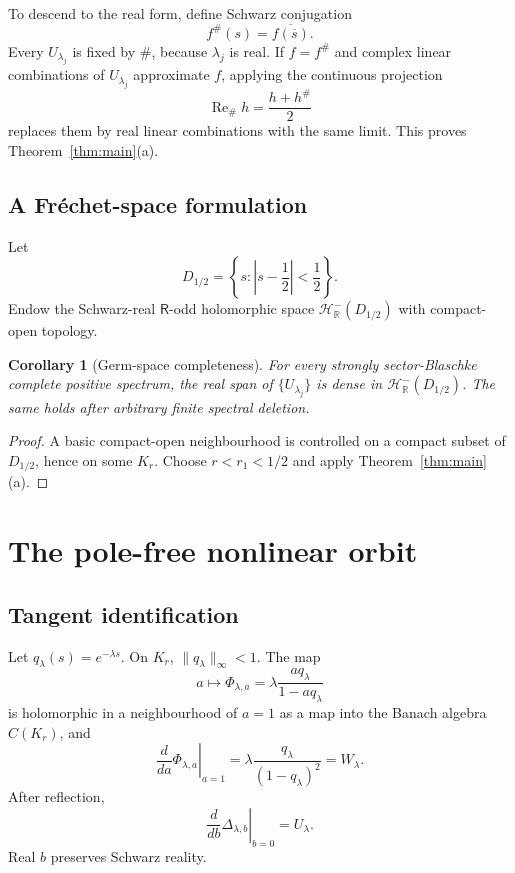 \documentclass[11pt]{article}
\newtheorem{corollary}[theorem]{Corollary}
\newcommand{\R}{\mathbb R}
\newcommand{\cH}{\mathcal H}
\newcommand{\FE}{\mathsf R}
\begin{document}
To descend to the real form, define Schwarz conjugation
\[
 f^\#(s)=\overline{f(\overline{s})}.
 \tag{5.2}
\]
Every \(U_{\lambda_j}\) is fixed by \(\#\), because \(\lambda_j\) is real.  If \(f=f^\#\)
and complex linear combinations of \(U_{\lambda_j}\) approximate \(f\), applying the
continuous projection
\[
 \operatorname{Re}_\# h=\frac{h+h^\#}{2}
 \tag{5.3}
\]
replaces them by real linear combinations with the same limit.  This proves
Theorem~\ref{thm:main}(a).

\subsection{A Fr\'echet-space formulation}

Let
\[
 D_{1/2}=\left\{s:\left|s-\frac12\right|<\frac12\right\}.
 \tag{5.4}
\]
Endow the Schwarz-real \(\FE\)-odd holomorphic space
\(\cH^-_{\R}(D_{1/2})\) with compact-open topology.

\begin{corollary}[Germ-space completeness]\label{cor:frechet}
For every strongly sector-Blaschke complete positive spectrum, the real span of
\(\{U_{\lambda_j}\}\) is dense in \(\cH^-_{\R}(D_{1/2})\).  The same holds after
arbitrary finite spectral deletion.
\end{corollary}

\begin{proof}
A basic compact-open neighbourhood is controlled on a compact subset of
\(D_{1/2}\), hence on some \(K_r\).  Choose \(r<r_1<1/2\) and apply
Theorem~\ref{thm:main}(a).
\end{proof}

\section{The pole-free nonlinear orbit}

\subsection{Tangent identification}

Let \(q_\lambda(s)=e^{-\lambda s}\).  On \(K_r\),
\(\|q_\lambda\|_\infty<1\).  The map
\[
 a\longmapsto \Phi_{\lambda,a}
  =\lambda\frac{a q_\lambda}{1-aq_\lambda}
 \tag{6.1}
\]
is holomorphic in a neighbourhood of \(a=1\) as a map into the Banach algebra
\(C(K_r)\), and
\[
 \left.\frac{d}{da}\Phi_{\lambda,a}\right|_{a=1}
 =\lambda\frac{q_\lambda}{(1-q_\lambda)^2}
 =W_\lambda.
 \tag{6.2}
\]
After reflection,
\[
 \left.\frac{d}{db}\Delta_{\lambda,b}\right|_{b=0}=U_\lambda.
 \tag{6.3}
\]
Real \(b\) preserves Schwarz reality.
\end{document}

